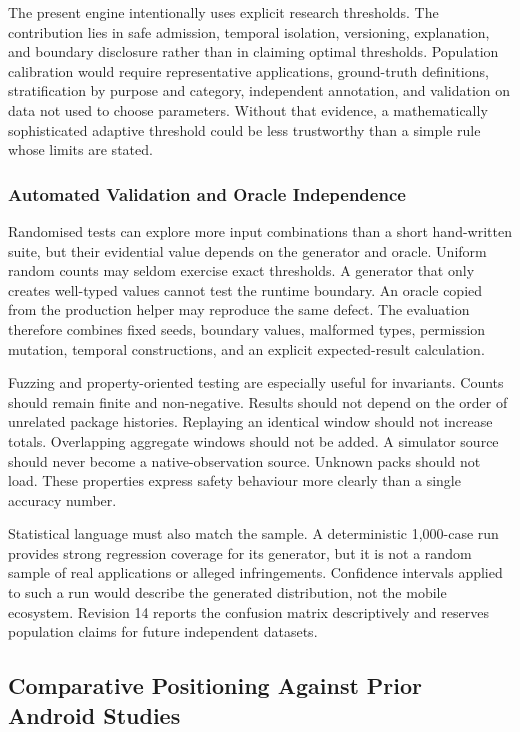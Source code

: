 The present engine intentionally uses explicit research thresholds. The contribution lies in safe admission, temporal isolation, versioning, explanation, and boundary disclosure rather than in claiming optimal thresholds. Population calibration would require representative applications, ground-truth definitions, stratification by purpose and category, independent annotation, and validation on data not used to choose parameters. Without that evidence, a mathematically sophisticated adaptive threshold could be less trustworthy than a simple rule whose limits are stated.

\subsubsection{Automated Validation and Oracle Independence}

Randomised tests can explore more input combinations than a short hand-written suite, but their evidential value depends on the generator and oracle. Uniform random counts may seldom exercise exact thresholds. A generator that only creates well-typed values cannot test the runtime boundary. An oracle copied from the production helper may reproduce the same defect. The evaluation therefore combines fixed seeds, boundary values, malformed types, permission mutation, temporal constructions, and an explicit expected-result calculation.

Fuzzing and property-oriented testing are especially useful for invariants. Counts should remain finite and non-negative. Results should not depend on the order of unrelated package histories. Replaying an identical window should not increase totals. Overlapping aggregate windows should not be added. A simulator source should never become a native-observation source. Unknown packs should not load. These properties express safety behaviour more clearly than a single accuracy number.

Statistical language must also match the sample. A deterministic 1,000-case run provides strong regression coverage for its generator, but it is not a random sample of real applications or alleged infringements. Confidence intervals applied to such a run would describe the generated distribution, not the mobile ecosystem. Revision 14 reports the confusion matrix descriptively and reserves population claims for future independent datasets.

\subsection{Comparative Positioning Against Prior Android Studies}

